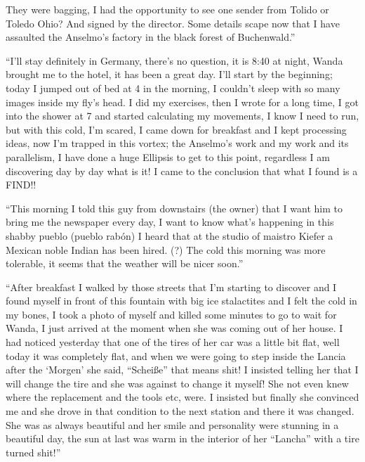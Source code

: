 \documentclass[smalldemyvopaper,11pt,twoside,onecolumn,openright,extrafontsizes]{memoir}
\begin{document}
They were bagging, I had the opportunity to see one sender from Tolido or Toledo Ohio? And signed by the director. Some details scape now that I have assaulted the Anselmo’s factory in the black forest of Buchenwald.”

“I’ll stay definitely in Germany, there’s no question, it is 8:40 at night, Wanda brought me to the hotel, it has been a great day. I’ll start by the beginning; today I jumped out of bed at 4 in the morning, I couldn’t sleep with so many images inside my fly’s head. I did my exercises, then I wrote for a long time, I got into the shower at 7 and started calculating my movements, I know I need to run, but with this cold, I’m scared, I came down for breakfast and I kept processing ideas, now I’m trapped in this vortex; the Anselmo’s work and my work and its parallelism, I have done a huge Ellipsis to get to this point, regardless I am discovering day by day what is it! I came to the conclusion that what I found is a FIND!!

“This morning I told this guy from downstairs (the owner) that I want him to bring me the newspaper every day, I want to know what’s happening in this shabby pueblo (pueblo rabón) I heard that at the studio of maistro Kiefer a Mexican noble Indian has been hired. (?) The cold this morning was more tolerable, it seems that the weather will be nicer soon.”

\ornamentbreak

“After breakfast I walked by those streets that I’m starting to discover and I found myself in front of this fountain with big ice stalactites and I felt the cold in my bones, I took a photo of myself and killed some minutes to go to wait for Wanda, I just arrived at the moment when she was coming out of her house. I had noticed yesterday that one of the tires of her car was a little bit flat, well today it was completely flat, and when we were going to step inside the Lancia after the ‘Morgen’ she said, “Scheiße” that means shit! I insisted telling her that I will change the tire and she was against to change it myself! She not even knew where the replacement and the tools etc, were. I insisted but finally she convinced me and she drove in that condition to the next station and there it was changed. She was as always beautiful and her smile and personality were stunning in a beautiful day, the sun at last was warm in the interior of her “Lancha” with a tire turned shit!”

\ornamentbreak
\end{document}
